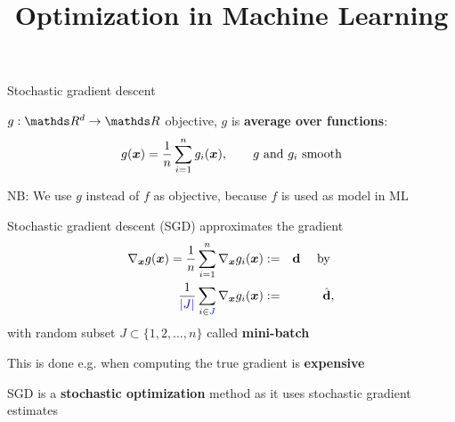 \documentclass[11pt,compress,t,notes=noshow, xcolor=table]{beamer}
\title{Optimization in Machine Learning}
\begin{document}

\begin{framei}{Stochastic gradient descent}
\item $g: \R^d \to \R$ objective, $g$ is \textbf{average over functions}:
$$
g(\bm{x}) = \frac{1}{n}\sum\limits_{i=1}^n g_i(\bm{x}), \qquad g \text{ and } g_i \text{ smooth}
$$
\begin{footnotesize}
    NB: We use $g$ instead of $f$ as objective, because $f$ is used as model in ML
\end{footnotesize}
\item Stochastic gradient descent (SGD) approximates the gradient
\begin{eqnarray*}
\nabla_{\bm{x}} g(\bm{x}) = \frac{1}{n}\sum\limits_{i=1}^n \nabla_{\bm{x}} g_i(\bm{x}) &:=& \mathbf{d} \quad \text{ by }\\
\frac{1}{\textcolor{blue}{|J|}}\sum_{i \in \textcolor{blue}{J}} \nabla_{\bm{x}} g_i(\bm{x}) &:=& \hat{\mathbf{d}},
\end{eqnarray*}
with random subset $J \subset \{1, 2, \ldots, n\}$ %
called \textbf{mini-batch}
\item This is done e.g. when computing the true gradient is \textbf{expensive}
\item SGD is a \textbf{stochastic optimization} method as it uses stochastic gradient estimates
\end{framei}
\end{document}
